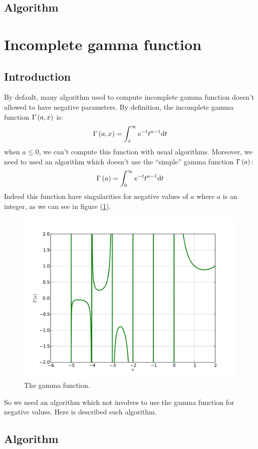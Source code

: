 \subsection{Algorithm}
%
\section{Incomplete gamma function}
%
\subsection{Introduction}
%
By default, many algorithm used to compute incomplete gamma function doesn't
allowed to have negative parameters. By definition, the incomplete gamma
function $\Gamma\left({a,x}\right)$ is:
%
\begin{equation}
    \Gamma\left({a,x}\right)=\int_x^\infty{e^{-t}{t^{a-1}}{\rm{d}}{t}}
\end{equation}
%
when $a\leq0$, we can't compute this function with usual algorithms. Moreover,
we need to used an algorithm which doesn't use the ``simple'' gamma function
$\Gamma\left({a}\right)$:
%
\begin{equation}
    \Gamma\left({a}\right)=\int_0^\infty{e^{-t}{t^{a-1}}{\rm{d}}{t}}
\end{equation}
%
Indeed this function have singularities for negative values of $a$ where $a$ is
an integer, as we can see in figure (\ref{fig:gamma}).
%
\begin{figure}[hbtp]
    \centering
    \includegraphics[width=0.5\linewidth]{figures/gamma/gamma}
    \caption{\footnotesize{}The gamma function.}
\label{fig:gamma}
\end{figure}
%
So we need an algorithm which not involves to use the gamma function for
negative values. Here is described such algorithm.
%
\subsection{Algorithm}
%
